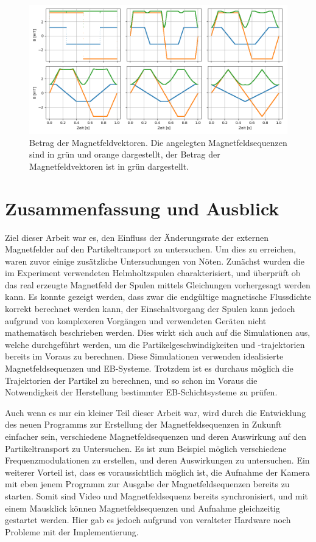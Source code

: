 \documentclass[page,pdftex,12pt,a4paper,twoside,openright]{scrbook}
\begin{document}
\begin{figure}[h]
\centering
\includegraphics[width=\textwidth]{./img/magnitude.png}
\caption{\label{fig-betrag}
Betrag der Magnetfeldvektoren. Die angelegten Magnetfeldsequenzen sind in grün und orange dargestellt, der Betrag der Magnetfeldvektoren ist in grün dargestellt.}
\end{figure}

\chapter{Zusammenfassung und Ausblick \label{sec-zusammenfassung}}
\label{sec:org37c5014}
Ziel dieser Arbeit war es, den Einfluss der Änderungsrate der externen Magnetfelder auf den Partikeltransport zu untersuchen. Um dies zu erreichen, waren zuvor einige zusätzliche Untersuchungen von Nöten. Zunächst wurden die im Experiment verwendeten Helmholtzspulen charakterisiert, und überprüft ob das real erzeugte Magnetfeld der Spulen mittels Gleichungen vorhergesagt werden kann. Es konnte gezeigt werden, dass zwar die endgültige magnetische Flussdichte korrekt berechnet werden kann, der Einschaltvorgang der Spulen kann jedoch aufgrund von komplexeren Vorgängen und verwendeten Geräten nicht mathematisch beschrieben werden. Dies wirkt sich auch auf die Simulationen aus, welche durchgeführt werden, um die Partikelgeschwindigkeiten und -trajektorien bereits im Voraus zu berechnen. Diese Simulationen verwenden idealisierte Magnetfeldsequenzen und EB-Systeme. Trotzdem ist es durchaus möglich die Trajektorien der Partikel zu berechnen, und so schon im Voraus die Notwendigkeit der Herstellung bestimmter EB-Schichtsysteme zu prüfen.

Auch wenn es nur ein kleiner Teil dieser Arbeit war, wird durch die Entwicklung des neuen Programms zur Erstellung der Magnetfeldsequenzen in Zukunft einfacher sein, verschiedene Magnetfeldsequenzen und deren Auswirkung auf den Partikeltransport zu Untersuchen. Es ist zum Beispiel möglich verschiedene Frequenzmodulationen zu erstellen, und deren Auswirkungen zu untersuchen.
Ein weiterer Vorteil ist, dass es voraussichtlich möglich ist, die Aufnahme der Kamera mit eben jenem Programm zur Ausgabe der Magnetfeldsequenzen bereits zu starten. Somit sind Video und Magnetfeldsequenz bereits synchronisiert, und mit einem Mausklick können Magnetfeldsequenzen und Aufnahme gleichzeitig gestartet werden. Hier gab es jedoch aufgrund von veralteter Hardware noch Probleme mit der Implementierung.
\end{document}
